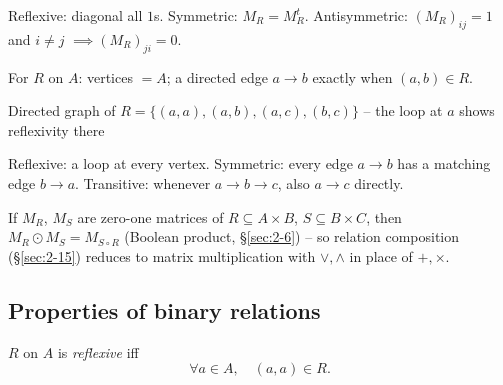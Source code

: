 \begin{note}
Reflexive: diagonal all $1$s. Symmetric: $M_R = M_R^t$. Antisymmetric: $(M_R)_{ij}=1$ and $i\neq j$ $\implies (M_R)_{ji}=0$.
\end{note}

\begin{definition}
For $R$ on $A$: vertices $=A$; a directed edge $a\to b$ exactly when $(a,b)\in R$.
\end{definition}

\begin{center}
\end{center}
\begin{center}
\small Directed graph of $R=\{(a,a),(a,b),(a,c),(b,c)\}$ -- the loop at $a$ shows reflexivity there
\end{center}

\begin{note}
Reflexive: a loop at every vertex. Symmetric: every edge $a\to b$ has a matching edge $b\to a$. Transitive: whenever $a\to b\to c$, also $a\to c$ directly.
\end{note}

\begin{note}
If $M_R$, $M_S$ are zero-one matrices of $R\subseteq A\times B$, $S\subseteq B\times C$, then $M_R\odot M_S = M_{S\circ R}$ (Boolean product, \S\ref{sec:2-6}) -- so relation composition (\S\ref{sec:2-15}) reduces to matrix multiplication with $\vee,\wedge$ in place of $+,\times$.
\end{note}

\subsection{Properties of binary relations}
\label{sec:2-14}

\begin{definition}[Reflexive]
$R$ on $A$ is \emph{reflexive} iff
\[
\forall a \in A,\quad (a,a) \in R.
\]
\end{definition}

